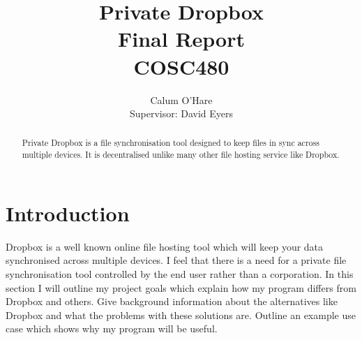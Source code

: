 \documentclass[12pt]{article}
\title{ Private Dropbox \\ Final Report \\ COSC480}
\author{Calum O'Hare \\ Supervisor: David Eyers}
\date{}
\begin{document}
\maketitle

\newpage
\begin{abstract}
Private Dropbox is a file synchronisation tool designed to
keep files in sync across multiple devices. It is decentralised
unlike many other file hosting service like Dropbox.
\end{abstract}
\newpage

\tableofcontents
\newpage

\section{Introduction}
Dropbox is a well known online file hosting tool which will
keep your data synchronised across multiple devices. I feel
that there is a need for a private file synchronisation tool
controlled by the end user rather than a corporation. In this
section I will outline my project goals which explain how
my program differs from Dropbox and others. Give background
information about the alternatives like Dropbox and what the
problems with these solutions are. Outline an example
use case which shows why my program will be useful.
\end{document}
